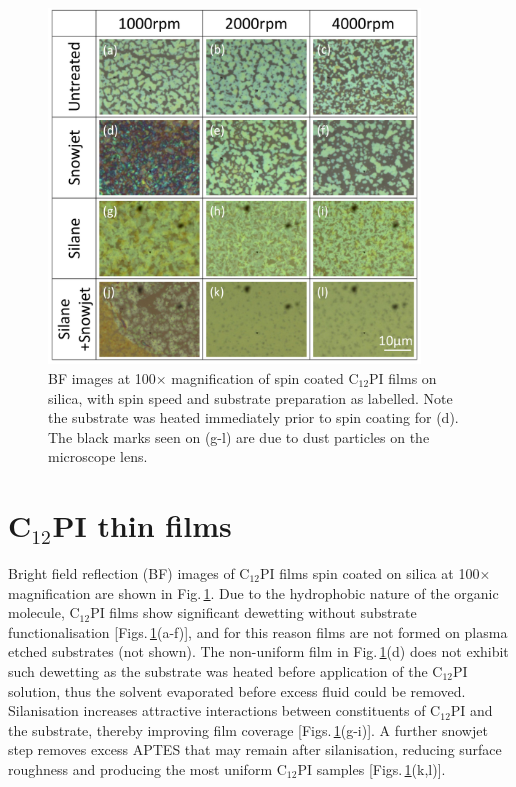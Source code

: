 \begin{figure}[h!]
\centering    
\includegraphics[width=0.88\textwidth]{Fig1}
\caption{BF images at 100$\times$ magnification of spin coated C$_{12}$PI films on silica, with spin speed and substrate preparation as labelled. Note the substrate was heated immediately prior to spin coating for (d). The black marks seen on (g-l) are due to dust particles on the microscope lens.}
\label{4Fig1}
\end{figure}
\section{C$_{12}$PI thin films}
\label{sec:4-1}
Bright field reflection (BF) images of C$_{12}$PI films spin coated on silica at 100$\times$ magnification are shown in Fig.\,\ref{4Fig1}. Due to the hydrophobic nature of the organic molecule, C$_{12}$PI films show significant dewetting without substrate functionalisation [Figs.\,\ref{4Fig1}(a-f)], and for this reason films are not formed on plasma etched substrates (not shown). The non-uniform film in Fig.\,\ref{4Fig1}(d) does not exhibit such dewetting as the substrate was heated before application of the C$_{12}$PI solution, thus the solvent evaporated before excess fluid could be removed. Silanisation increases attractive interactions between constituents of C$_{12}$PI and the substrate, thereby improving film coverage [Figs.\,\ref{4Fig1}(g-i)]. A further snowjet step removes excess APTES that may remain after silanisation, reducing surface roughness and producing the most uniform C$_{12}$PI samples [Figs.\,\ref{4Fig1}(k,l)].

